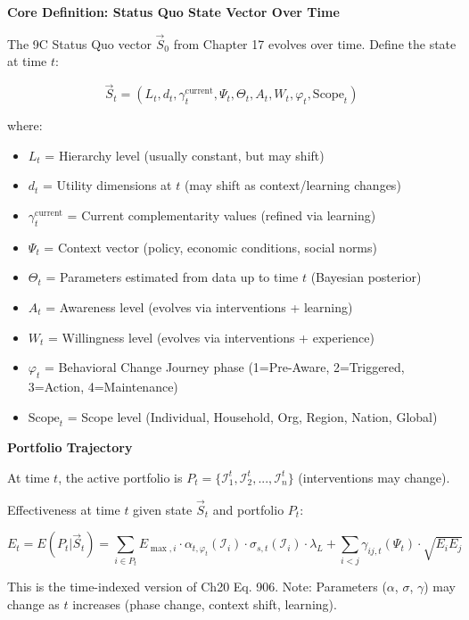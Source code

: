 \textbf{Core Definition: Status Quo State Vector Over Time}

The 9C Status Quo vector $\vec{S}_0$ from Chapter 17 evolves over time. Define the state at time $t$:

\begin{equation}
\vec{S}_t = (L_t, d_t, \gamma^{\text{current}}_t, \Psi_t, \Theta_t, A_t, W_t, \varphi_t, \text{Scope}_t)
\label{eq:kkk-state-vector}
\end{equation}

where:
\begin{itemize}[nosep]
\item $L_t$ = Hierarchy level (usually constant, but may shift)
\item $d_t$ = Utility dimensions at $t$ (may shift as context/learning changes)
\item $\gamma^{\text{current}}_t$ = Current complementarity values (refined via learning)
\item $\Psi_t$ = Context vector (policy, economic conditions, social norms)
\item $\Theta_t$ = Parameters estimated from data up to time $t$ (Bayesian posterior)
\item $A_t$ = Awareness level (evolves via interventions + learning)
\item $W_t$ = Willingness level (evolves via interventions + experience)
\item $\varphi_t$ = Behavioral Change Journey phase (1=Pre-Aware, 2=Triggered, 3=Action, 4=Maintenance)
\item $\text{Scope}_t$ = Scope level (Individual, Household, Org, Region, Nation, Global)
\end{itemize}

\textbf{Portfolio Trajectory}

At time $t$, the active portfolio is $P_t = \{\mathcal{I}^t_1, \mathcal{I}^t_2, ..., \mathcal{I}^t_n\}$ (interventions may change).

Effectiveness at time $t$ given state $\vec{S}_t$ and portfolio $P_t$:

\begin{equation}
E_t = E(P_t | \vec{S}_t) = \sum_{i \in P_t} E_{\max,i} \cdot \alpha_{t,\varphi_t}(\mathcal{I}_i) \cdot \sigma_{s,t}(\mathcal{I}_i) \cdot \lambda_L + \sum_{i<j} \gamma_{ij,t}(\Psi_t) \cdot \sqrt{E_i E_j}
\label{eq:kkk-effectiveness-dynamic}
\end{equation}

This is the time-indexed version of Ch20 Eq. 906. Note: Parameters ($\alpha$, $\sigma$, $\gamma$) may change as $t$ increases (phase change, context shift, learning).

